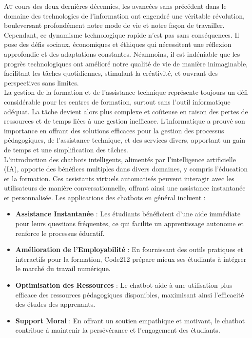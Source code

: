 \documentclass[a4paper, 11pt, openany]{report}
\begin{document}

\lettrine[nindent=0em, slope=-.5em]{\color{Eblue}A}{u} cours des deux dernières décennies, les avancées sans précédent dans le domaine des technologies de l'information ont engendré une véritable révolution, bouleversant profondément notre mode de vie et notre façon de travailler. Cependant, ce dynamisme technologique rapide n'est pas sans conséquences. Il pose des défis sociaux, économiques et éthiques qui nécessitent une réflexion approfondie et des adaptations constantes. Néanmoins, il est indéniable que les progrès technologiques ont amélioré notre qualité de vie de manière inimaginable, facilitant les tâches quotidiennes, stimulant la créativité, et ouvrant des perspectives sans limites.
\\

La gestion de la formation et de l'assistance technique représente toujours un défi considérable pour les centres de formation, surtout sans l’outil informatique adéquat. La tâche devient alors plus complexe et coûteuse en raison des pertes de ressources et de temps liées à une gestion inefficace. L’informatique a prouvé son importance en offrant des solutions efficaces pour la gestion des processus pédagogiques, de l’assistance technique, et des services divers, apportant un gain de temps et une simplification des tâches.
\\
L'introduction des chatbots intelligents, alimentés par l'intelligence artificielle (IA), apporte des bénéfices multiples dans divers domaines, y compris l'éducation et la formation. Ces assistants virtuels automatisés peuvent interagir avec les utilisateurs de manière conversationnelle, offrant ainsi une assistance instantanée et personnalisée. Les applications des chatbots en général incluent :
\begin{itemize}
    \item \textbf{Assistance Instantanée} : Les étudiants bénéficient d'une aide immédiate pour leurs questions fréquentes, ce qui facilite un apprentissage autonome et renforce le processus éducatif.
    \item \textbf{Amélioration de l'Employabilité} : En fournissant des outils pratiques et interactifs pour la formation, Code212 prépare mieux ses étudiants à intégrer le marché du travail numérique.
    \item \textbf{Optimisation des Ressources} : Le chatbot aide à une utilisation plus efficace des ressources pédagogiques disponibles, maximisant ainsi l'efficacité des études des apprenants.
    \item \textbf{Support Moral} : En offrant un soutien empathique et motivant, le chatbot contribue à maintenir la persévérance et l'engagement des étudiants.
\end{itemize}
\ \\
\end{document}
